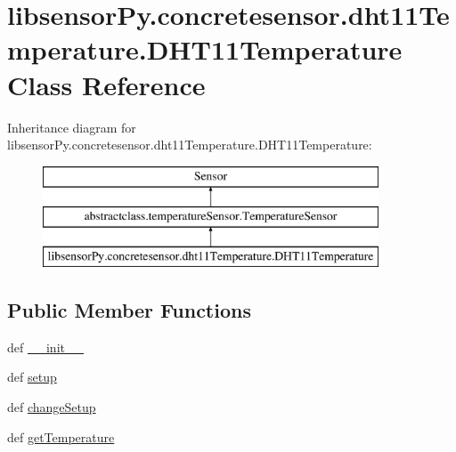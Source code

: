 \hypertarget{classlibsensorPy_1_1concretesensor_1_1dht11Temperature_1_1DHT11Temperature}{}\section{libsensor\+Py.\+concretesensor.\+dht11\+Temperature.\+D\+H\+T11\+Temperature Class Reference}
\label{classlibsensorPy_1_1concretesensor_1_1dht11Temperature_1_1DHT11Temperature}
Inheritance diagram for libsensor\+Py.\+concretesensor.\+dht11\+Temperature.\+D\+H\+T11\+Temperature\+:\begin{figure}[H]
\begin{center}
\leavevmode
\includegraphics[height=3.000000cm]{classlibsensorPy_1_1concretesensor_1_1dht11Temperature_1_1DHT11Temperature}
\end{center}
\end{figure}
\subsection*{Public Member Functions}
\begin{DoxyCompactItemize}
\item 
def \hyperlink{classlibsensorPy_1_1concretesensor_1_1dht11Temperature_1_1DHT11Temperature_a0b00a354b48132721b90673f88887633}{\+\_\+\+\_\+init\+\_\+\+\_\+}
\item 
def \hyperlink{classlibsensorPy_1_1concretesensor_1_1dht11Temperature_1_1DHT11Temperature_a462fb9f97389111285788bf45d6127da}{setup}
\item 
def \hyperlink{classlibsensorPy_1_1concretesensor_1_1dht11Temperature_1_1DHT11Temperature_a0f24c2f9936a7ec28cf3dfdd6752956a}{change\+Setup}
\item 
def \hyperlink{classlibsensorPy_1_1concretesensor_1_1dht11Temperature_1_1DHT11Temperature_a306d13507bd20a69c698099796cdba6c}{get\+Temperature}
\end{DoxyCompactItemize}
